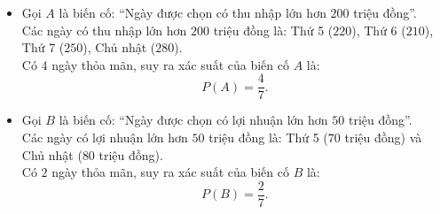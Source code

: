 \begin{bt}
{\begin{enumerate}[a)]
	\begin{itemize}
		\item Gọi $A$ là biến cố: ``Ngày được chọn có thu nhập lớn hơn $200$ triệu đồng''.\\
		Các ngày có thu nhập lớn hơn $200$ triệu đồng là: Thứ 5 ($220$), Thứ 6 ($210$), Thứ 7 ($250$), Chủ nhật ($280$).\\
		Có $4$ ngày thỏa mãn, suy ra xác suất của biến cố $A$ là:
		$$P(A) = \dfrac{4}{7}.$$
		\item Gọi $B$ là biến cố: ``Ngày được chọn có lợi nhuận lớn hơn $50$ triệu đồng''.\\
		Các ngày có lợi nhuận lớn hơn $50$ triệu đồng là: Thứ 5 ($70$ triệu đồng) và Chủ nhật ($80$ triệu đồng).\\
		Có $2$ ngày thỏa mãn, suy ra xác suất của biến cố $B$ là:
		$$P(B) = \dfrac{2}{7}.$$
	\end{itemize}
\end{enumerate}
}
\end{bt}

